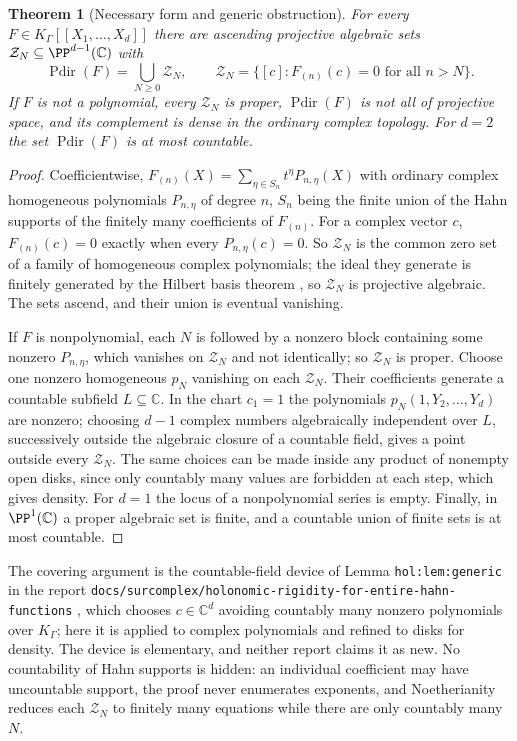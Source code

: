 \documentclass[11pt]{article}
\newtheorem{theorem}{Theorem}[section]
\theoremstyle{plain}
\theoremstyle{plain}
\theoremstyle{plain}
\theoremstyle{definition}
\theoremstyle{definition}
\theoremstyle{definition}
\theoremstyle{definition}
\theoremstyle{remark}
\newcommand{\C}{\mathbb C}\newcommand{\R}{\mathbb R}
\newcommand{\K}{K_\Gamma}\newcommand{\KD}{K_\Delta}
\DeclareMathOperator{\Pdir}{Pdir}\DeclareMathOperator{\Adm}{Adm}
\begin{document}
\begin{theorem}[Necessary form and generic obstruction]
\label{ent:mv:thm:exceptional}
For every $F\in\K[[X_1,\ldots,X_d]]$ there are ascending projective algebraic
sets $\mathcal Z_N\subseteq\PP^{d-1}(\C)$ with
\[
 \Pdir(F)=\bigcup_{N\ge0}\mathcal Z_N,\qquad
 \mathcal Z_N=\{[c]:F_{(n)}(c)=0\text{ for all }n>N\}.
\]
If $F$ is not a polynomial, every $\mathcal Z_N$ is proper, $\Pdir(F)$ is not
all of projective space, and its complement is dense in the ordinary complex
topology. For $d=2$ the set $\Pdir(F)$ is at most countable.
\end{theorem}
\begin{proof}
Coefficientwise, $F_{(n)}(X)=\sum_{\eta\in S_n}t^\eta P_{n,\eta}(X)$ with
ordinary complex homogeneous polynomials $P_{n,\eta}$ of degree $n$, $S_n$
being the finite union of the Hahn supports of the finitely many coefficients
of $F_{(n)}$. For a complex vector $c$, $F_{(n)}(c)=0$ exactly when every
$P_{n,\eta}(c)=0$. So $\mathcal Z_N$ is the common zero set of a family of
homogeneous complex polynomials; the ideal they generate is finitely
generated by the Hilbert basis theorem \cite{Stacks}, so $\mathcal Z_N$ is
projective algebraic. The sets ascend, and their union is eventual vanishing.

If $F$ is nonpolynomial, each $N$ is followed by a nonzero block containing
some nonzero $P_{n,\eta}$, which vanishes on $\mathcal Z_N$ and not
identically; so $\mathcal Z_N$ is proper. Choose one nonzero homogeneous
$p_N$ vanishing on each $\mathcal Z_N$. Their coefficients generate a
countable subfield $L\subseteq\C$. In the chart $c_1=1$ the polynomials
$p_N(1,Y_2,\ldots,Y_d)$ are nonzero; choosing $d-1$ complex numbers
algebraically independent over $L$, successively outside the algebraic
closure of a countable field, gives a point outside every $\mathcal Z_N$. The
same choices can be made inside any product of nonempty open disks, since only
countably many values are forbidden at each step, which gives density. For
$d=1$ the locus of a nonpolynomial series is empty. Finally, in $\PP^1(\C)$ a
proper algebraic set is finite, and a countable union of finite sets is at
most countable.
\end{proof}

The covering argument is the countable-field device of Lemma
\texttt{hol:lem:generic} in the report
\texttt{docs/surcomplex/holonomic-rigidity-for-entire-hahn-functions}
\cite{RepoHolonomic}, which chooses $c\in\C^d$ avoiding countably many
nonzero polynomials over $\K$; here it is applied to complex polynomials and
refined to disks for density. The device is elementary, and neither report
claims it as new. No countability of Hahn supports is hidden: an individual
coefficient may have uncountable support, the proof never enumerates
exponents, and Noetherianity reduces each $\mathcal Z_N$ to finitely many
equations while there are only countably many $N$.
\end{document}
